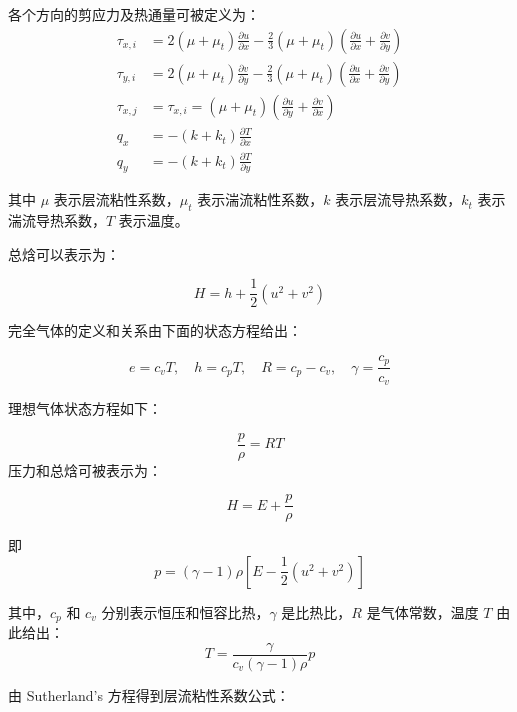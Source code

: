 各个方向的剪应力及热通量可被定义为：
\begin{align}
\tau_{x,i} &= 2(\mu + \mu_t) \frac{\partial u}{\partial x} - \frac{2}{3} (\mu + \mu_t) \left( \frac{\partial u}{\partial x} + \frac{\partial v}{\partial y} \right) \\
\tau_{y,i} &= 2(\mu + \mu_t) \frac{\partial v}{\partial y} - \frac{2}{3} (\mu + \mu_t) \left( \frac{\partial u}{\partial x} + \frac{\partial v}{\partial y} \right) \\
\tau_{x,j} &= \tau_{x,i} = (\mu + \mu_t) \left( \frac{\partial u}{\partial y} + \frac{\partial v}{\partial x} \right)  \\
q_x &= -(k + k_t) \frac{\partial T}{\partial x} \\
q_y &= -(k + k_t) \frac{\partial T}{\partial y}
\end{align}

其中 \(\mu\) 表示层流粘性系数，\(\mu_t\) 表示湍流粘性系数，\(k\) 表示层流导热系数，\(k_t\) 表示湍流导热系数，\(T\) 表示温度。

总焓可以表示为：

\begin{equation}
H = h + \frac{1}{2}(u^2 + v^2)
\end{equation}

完全气体的定义和关系由下面的状态方程给出：

\begin{equation}
e = c_v T, \quad h = c_p T, \quad R = c_p - c_v, \quad \gamma = \frac{c_p}{c_v} 
\end{equation}

理想气体状态方程如下：

\begin{equation}
\frac{p}{\rho} = RT 
\end{equation}
压力和总焓可被表示为：

\begin{equation}
H = E + \frac{p}{\rho} 
\end{equation}

即
\begin{equation}
p = (\gamma - 1) \rho \left[ E - \frac{1}{2}(u^2 + v^2) \right] 
\end{equation}

其中，\(c_p\) 和 \(c_v\) 分别表示恒压和恒容比热，\(\gamma\) 是比热比，\(R\) 是气体常数，温度 \(T\) 由此给出：
\begin{equation}
T = \frac{\gamma}{c_v (\gamma - 1) \rho} p 
\end{equation}

由 Sutherland's 方程得到层流粘性系数公式：


